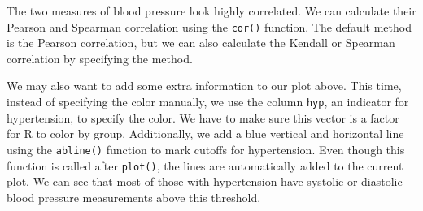 \documentclass[
  letterpaper,
]{krantz}
\makeatletter
\newenvironment{Shaded}{\begin{snugshade}}{\end{snugshade}}
\newcommand{\AttributeTok}[1]{\textcolor[rgb]{0.40,0.45,0.13}{#1}}
\newcommand{\CommentTok}[1]{\textcolor[rgb]{0.37,0.37,0.37}{#1}}
\newcommand{\DecValTok}[1]{\textcolor[rgb]{0.68,0.00,0.00}{#1}}
\newcommand{\FunctionTok}[1]{\textcolor[rgb]{0.28,0.35,0.67}{#1}}
\newcommand{\NormalTok}[1]{\textcolor[rgb]{0.00,0.23,0.31}{#1}}
\newcommand{\SpecialCharTok}[1]{\textcolor[rgb]{0.37,0.37,0.37}{#1}}
\newcommand{\StringTok}[1]{\textcolor[rgb]{0.13,0.47,0.30}{#1}}
\newenvironment{kframe}{%
\medskip{}
\setlength{\fboxsep}{.8em}
 \def\at@end@of@kframe{}%
 \ifinner\ifhmode%
  \def\at@end@of@kframe{\end{minipage}}%
  \begin{minipage}{\columnwidth}%
 \fi\fi%
 \def\FrameCommand##1{\hskip\@totalleftmargin \hskip-\fboxsep
 \colorbox{shadecolor}{##1}\hskip-\fboxsep
     \hskip-\linewidth \hskip-\@totalleftmargin \hskip\columnwidth}%
 \MakeFramed {\advance\hsize-\width
   \@totalleftmargin\z@ \linewidth\hsize
   \@setminipage}}%
 {\par\unskip\endMakeFramed%
 \at@end@of@kframe}
\renewenvironment{Shaded}{\begin{kframe}}{\end{kframe}}
\makeatother
\begin{document}
The two measures of blood pressure look highly correlated. We can
calculate their Pearson and Spearman correlation using the
\texttt{cor()} function. The default method is the Pearson correlation,
but we can also calculate the Kendall or Spearman correlation by
specifying the method.

\begin{Shaded}
\end{Shaded}

We may also want to add some extra information to our plot above. This
time, instead of specifying the color manually, we use the column
\texttt{hyp}, an indicator for hypertension, to specify the color. We
have to make sure this vector is a factor for R to color by group.
Additionally, we add a blue vertical and horizontal line using the
\texttt{abline()} function to mark cutoffs for hypertension. Even though
this function is called after \texttt{plot()}, the lines are
automatically added to the current plot. We can see that most of those
with hypertension have systolic or diastolic blood pressure measurements
above this threshold.

\begin{Shaded}
\end{Shaded}
\end{document}
